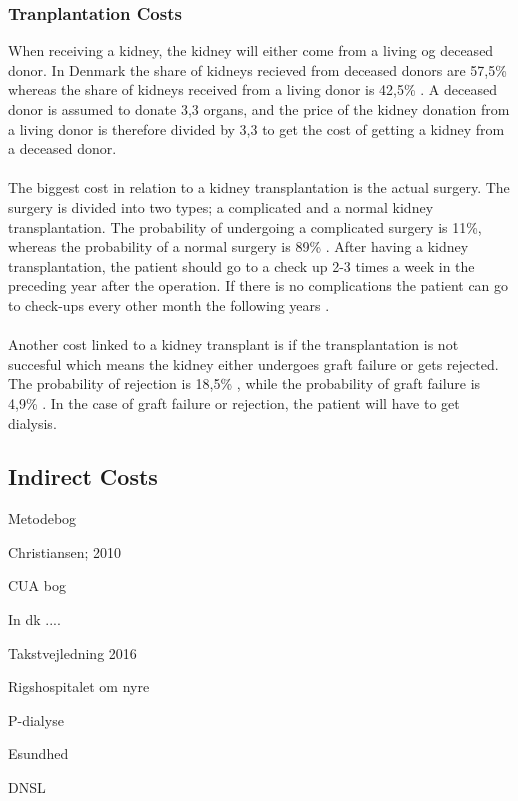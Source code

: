 \documentclass[a4paper,12pt]{article}
\begin{document}
\subsubsection*{Tranplantation Costs}

When receiving a kidney, the kidney will either come from a living og deceased donor. In Denmark the share of kidneys recieved from deceased donors are 57,5\% whereas the share of kidneys received from a living donor is  42,5\% \cite{DNSL}. A deceased donor is assumed to donate 3,3 organs, and the price of the kidney donation from a living donor  is therefore divided by 3,3 to get the cost of getting a kidney from a deceased donor. 
\\\\
The biggest cost in relation to a kidney  transplantation is the actual surgery. The surgery is divided into two types; a complicated and a normal kidney transplantation. The probability of undergoing a complicated surgery is 11\%, whereas the probability of a normal surgery is 89\% \cite{esundhed} \cite{CUAdkartikel}. After having a kidney transplantation, the patient should go to a check up 2-3 times a week in the preceding year after the operation. If there is no complications the patient can go to check-ups every other month the following years \cite{Rigshospitalet}. 
\\\\
Another cost linked to a kidney transplant is if the transplantation is not succesful which means the kidney either undergoes graft failure or gets rejected. The probability of rejection is 18,5\% \cite{Rigshospitalet}, while the probability of graft failure is 4,9\% \cite{DNSL}. In the case of graft failure or rejection, the patient will have to get dialysis.

\subsection{Indirect Costs}


\newpage
\begin{thebibliography}{9}

Metodebog

Christiansen; 2010

CUA bog

In dk .... 

Takstvejledning 2016

Rigshospitalet om nyre

P-dialyse

Esundhed

DNSL

\end{thebibliography}	
	
\end{document}
